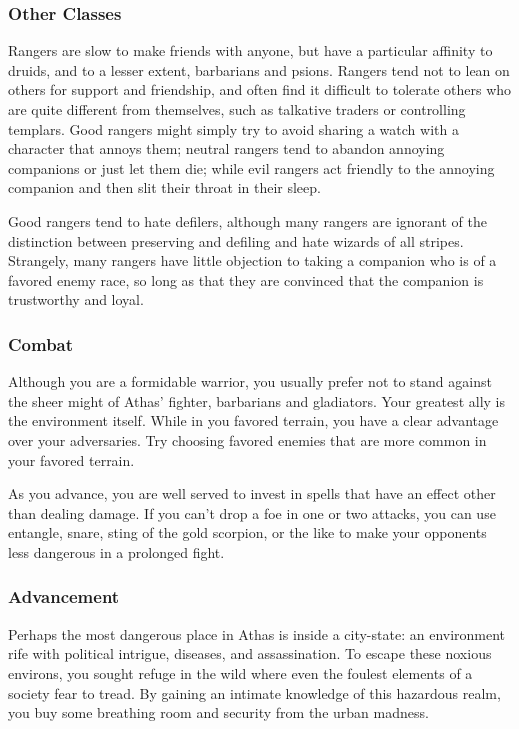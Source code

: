 \subsubsection{Other Classes}

Rangers are slow to make friends with anyone, but have a particular affinity to druids, and to a lesser extent, barbarians and psions. Rangers tend not to lean on others for support and friendship, and often find it difficult to tolerate others who are quite different from themselves, such as talkative traders or controlling templars. Good rangers might simply try to avoid sharing a watch with a character that annoys them; neutral rangers tend to abandon annoying companions or just let them die; while evil rangers act friendly to the annoying companion and then slit their throat in their sleep.

Good rangers tend to hate defilers, although many rangers are ignorant of the distinction between preserving and defiling and hate wizards of all stripes. Strangely, many rangers have little objection to taking a companion who is of a favored enemy race, so long as that they are convinced that the companion is trustworthy and loyal.

\subsubsection{Combat}

Although you are a formidable warrior, you usually prefer not to stand against the sheer might of Athas' fighter, barbarians and gladiators. Your greatest ally is the environment itself. While in you favored terrain, you have a clear advantage over your adversaries. Try choosing favored enemies that are more common in your favored terrain.

As you advance, you are well served to invest in spells that have an effect other than dealing damage. If you can't drop a foe in one or two attacks, you can use entangle, snare, sting of the gold scorpion, or the like to make your opponents less dangerous in a prolonged fight.

\subsubsection{Advancement}

Perhaps the most dangerous place in Athas is inside a city-state: an environment rife with political intrigue, diseases, and assassination. To escape these noxious environs, you sought refuge in the wild where even the foulest elements of a society fear to tread. By gaining an intimate knowledge of this hazardous realm, you buy some breathing room and security from the urban madness.

